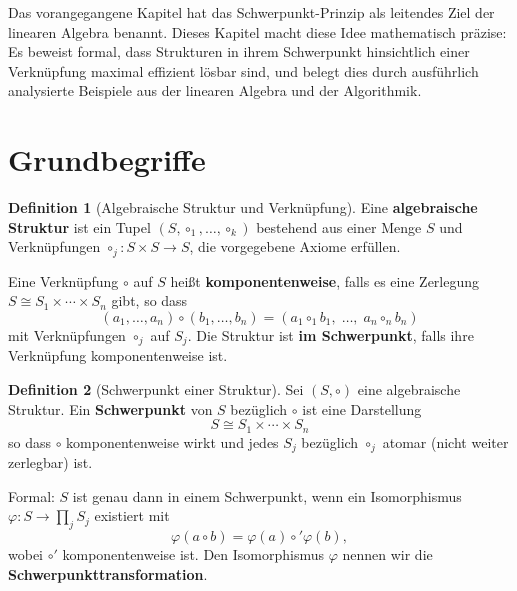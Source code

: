 ﻿\documentclass[a4paper,12pt]{report}
\theoremstyle{definition}
\newtheorem{definition}{Definition}
\begin{document}
Das vorangegangene Kapitel hat das Schwerpunkt-Prinzip als leitendes
Ziel der linearen Algebra benannt. Dieses Kapitel macht diese Idee
mathematisch präzise: Es beweist formal, dass Strukturen in ihrem
Schwerpunkt hinsichtlich einer Verknüpfung maximal effizient lösbar
sind, und belegt dies durch ausführlich analysierte Beispiele aus
der linearen Algebra und der Algorithmik.

\section{Grundbegriffe}

\begin{definition}[Algebraische Struktur und Verknüpfung]
    Eine \textbf{algebraische Struktur} ist ein Tupel $(S, \circ_1, \ldots, \circ_k)$
    bestehend aus einer Menge $S$ und Verknüpfungen
    $\circ_j : S \times S \to S$, die vorgegebene Axiome erfüllen.

    Eine Verknüpfung $\circ$ auf $S$ heißt \textbf{komponentenweise},
    falls es eine Zerlegung $S \cong S_1 \times \cdots \times S_n$
    gibt, so dass
    \[
        (a_1, \ldots, a_n) \circ (b_1, \ldots, b_n)
        = (a_1 \circ_1 b_1,\; \ldots,\; a_n \circ_n b_n)
    \]
    mit Verknüpfungen $\circ_j$ auf $S_j$.
    Die Struktur ist \textbf{im Schwerpunkt}, falls ihre Verknüpfung
    komponentenweise ist.
\end{definition}

\begin{definition}[Schwerpunkt einer Struktur]
    Sei $(S, \circ)$ eine algebraische Struktur. Ein
    \textbf{Schwerpunkt} von $S$ bezüglich $\circ$ ist eine Darstellung
    \[
        S \cong S_1 \times \cdots \times S_n
    \]
    so dass $\circ$ komponentenweise wirkt und jedes $S_j$ bezüglich
    $\circ_j$ atomar (nicht weiter zerlegbar) ist.

    Formal: $S$ ist genau dann in einem Schwerpunkt, wenn ein
    Isomorphismus $\varphi : S \to \prod_j S_j$ existiert mit
    \[
        \varphi(a \circ b) = \varphi(a) \circ' \varphi(b),
    \]
    wobei $\circ'$ komponentenweise ist. Den Isomorphismus $\varphi$
    nennen wir die \textbf{Schwerpunkttransformation}.
\end{definition}
\end{document}
